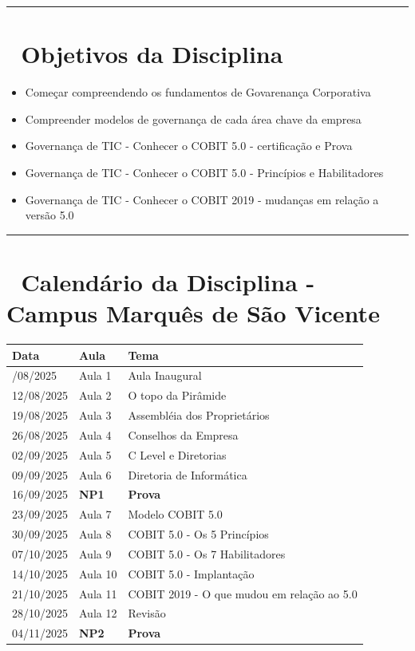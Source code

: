 \documentclass[
]{book}
\begin{document}
\begin{center}\rule{0.5\linewidth}{0.5pt}\end{center}

\section{🎯 Objetivos da Disciplina}\label{objetivos-da-disciplina}

\begin{itemize}
\item
  Começar compreendendo os fundamentos de Govarenança Corporativa
\item
  Compreender modelos de governança de cada área chave da empresa
\item
  Governança de TIC - Conhecer o COBIT 5.0 - certificação e Prova
\item
  Governança de TIC - Conhecer o COBIT 5.0 - Princípios e Habilitadores
\item
  Governança de TIC - Conhecer o COBIT 2019 - mudanças em relação a versão 5.0
\end{itemize}

\begin{center}\rule{0.5\linewidth}{0.5pt}\end{center}

\section{📅 Calendário da Disciplina - Campus Marquês de São Vicente}\label{calenduxe1rio-da-disciplina---campus-marquuxeas-de-suxe3o-vicente}

\begin{longtable}[]{@{}lll@{}}
\toprule\noalign{}
Data & Aula & Tema \\
\midrule\noalign{}
\endhead
\bottomrule\noalign{}
\endlastfoot
05/08/2025 & Aula 1 & Aula Inaugural \\
12/08/2025 & Aula 2 & O topo da Pirâmide \\
19/08/2025 & Aula 3 & Assembléia dos Proprietários \\
26/08/2025 & Aula 4 & Conselhos da Empresa \\
02/09/2025 & Aula 5 & C Level e Diretorias \\
09/09/2025 & Aula 6 & Diretoria de Informática \\
16/09/2025 & \textbf{NP1} & \textbf{Prova} \\
23/09/2025 & Aula 7 & Modelo COBIT 5.0 \\
30/09/2025 & Aula 8 & COBIT 5.0 - Os 5 Princípios \\
07/10/2025 & Aula 9 & COBIT 5.0 - Os 7 Habilitadores \\
14/10/2025 & Aula 10 & COBIT 5.0 - Implantação \\
21/10/2025 & Aula 11 & COBIT 2019 - O que mudou em relação ao 5.0 \\
28/10/2025 & Aula 12 & Revisão \\
04/11/2025 & \textbf{NP2} & \textbf{Prova} \\
\end{longtable}
\end{document}
